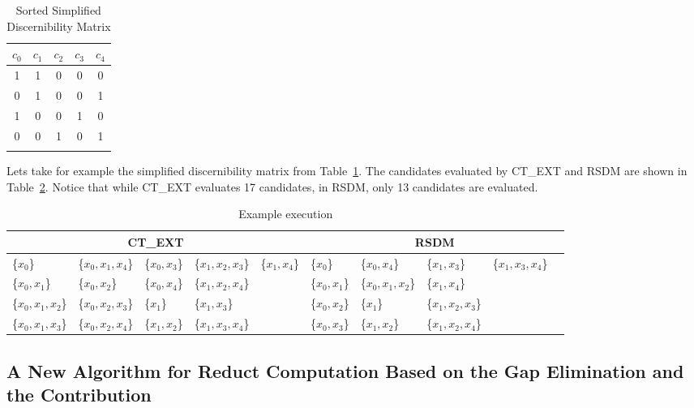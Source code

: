 \documentclass[authoryear,11pt]{elsarticle}
\begin{document}
	\begin{table}[!htb]
      \centering
        \caption{Sorted Simplified Discernibility Matrix}
        \begin{tabular}{ccccc}\label{tab:SDM}
            $c_0$ & $c_1$ & $c_2$ & $c_3$ & $c_4$\\
        		\hline
        		1&1&0&0&0\\
        		0&1&0&0&1\\
        		1&0&0&1&0\\
        		0&0&1&0&1\\
        		\\
        \end{tabular} 
	\end{table}	
		
	Lets take for example the simplified discernibility matrix from Table~\ref{tab:SDM}. The candidates evaluated 
	by CT\_EXT and RSDM  are shown in Table~\ref{tab:run}. Notice that while CT\_EXT evaluates 17 candidates,
	in RSDM, only 13 candidates are evaluated.
	
	\begin{table}[!htb]\scriptsize
		\setlength{\tabcolsep}{.05em}
		\caption{Example execution}\label{tab:run}
      	\centering
    		\begin{tabular}{|lllll|lllll|}
    		\hline
    		\multicolumn{5}{|c|}{CT\_EXT} & \multicolumn{5}{c|}{RSDM}\\
    		\hline
    		\{$ x_0$\} 	 		& \{$x_0,x_1,x_4$\}	& \{$x_0,x_3$\}		& \{$x_1,x_2,x_3$\}	& \{$x_1,x_4$\}	
    		& \{$x_0$\}			& \{$x_0,x_4$\} 		& \{$x_1,x_3$\} 		& \{$x_1,x_3,x_4$\}	&\\
    		\{$x_0,x_1$\} 		& \{$x_0,x_2$\}  	& \{$x_0,x_4$\}		& \{$x_1,x_2,x_4$\}	& 
    		& \{$x_0,x_1$\}		& \{$x_0,x_1,x_2$\} 	& \{$x_1,x_4$\}		&&\\
    		\{$x_0,x_1,x_2$\}	& \{$x_0,x_2,x_3$\}	& \{$x_1$\}			& \{$x_1,x_3$\}	  	&			
    		& \{$x_0,x_2$\} 		& \{$x_1$\}		 	& \{$x_1,x_2,x_3$\}	&&\\
    		\{$x_0,x_1,x_3$\} 	& \{$x_0,x_2,x_4$\}	& \{$x_1,x_2$\} 		& \{$x_1,x_3,x_4$\}	&			
    		& \{$x_0,x_3$\} 		& \{$x_1,x_2$\}	 	& \{$x_1,x_2,x_4$\}	&&\\
    		\hline
		\end{tabular}
	\end{table}


\subsection{A New Algorithm for Reduct Computation Based on the Gap Elimination and the Contribution}
\end{document}
